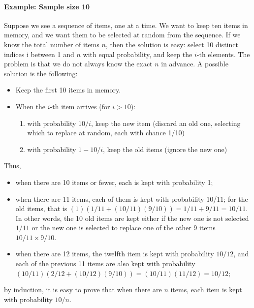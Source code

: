 \paragraph{Example: Sample size 10}
\begin{flushleft}
Suppose we see a sequence of items, one at a time. We want to keep ten items in memory, and we want them to be selected at random from the sequence. If we know the total number of items $ n $, then the solution is easy: select 10 distinct indices i between 1 and $ n $ with equal probability, and keep the $ i $-th elements. The problem is that we do not always know the exact $ n $ in advance. A possible solution is the following:

\begin{itemize}
\item Keep the first 10 items in memory.
\item When the $i$-th item arrives (for $i > 10$):
\begin{enumerate}
\item with probability $ 10 / i $, keep the new item (discard an old one, selecting which to replace at random, each with chance 1/10)
\item with probability $1 − 10 / i$, keep the old items (ignore the new one)
\end{enumerate}
\end{itemize}
Thus, 
\begin{itemize}
\item when there are 10 items or fewer, each is kept with probability 1;
\item when there are 11 items, each of them is kept with probability 10/11; for the old items, that is $(1)(1/11 + (10/11)(9/10)) = 1/11 + 9/11 = 10/11$. In other words, the 10 old items are kept either if the new one is not selected $ 1/11 $ or the new one is selected to replace one of the other 9 items $10/11 \times 9/10$.
\item when there are 12 items, the twelfth item is kept with probability $ 10/12 $, and each of the previous 11 items are also kept with probability $(10/11)(2/12 + (10/12)(9/10)) = (10/11)(11/12) = 10/12$;
\end{itemize}

by induction, it is easy to prove that when there are $ n $ items, each item is kept with probability $ 10 / n $.
\end{flushleft}

